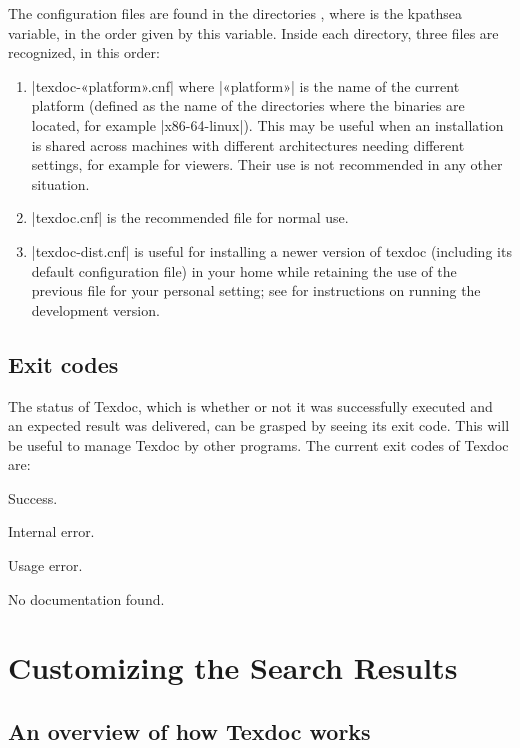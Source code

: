 \documentclass{texdoc-doc}
\begin{document}
The configuration files are found in the directories , where
 is the kpathsea variable, in the order given by this variable.
Inside each directory, three files are recognized, in this order:
%
\begin{enumerate}
\item |texdoc-«platform».cnf| where |«platform»| is the name of the current
  platform (defined as the name of the directories where the {\TL}
  binaries are located, for example |x86-64-linux|). This may be useful when
  an installation is shared across machines with different architectures
  needing different settings, for example for viewers. Their use is not
  recommended in any other situation.
\item |texdoc.cnf| is the recommended file for normal use.
\item |texdoc-dist.cnf| is useful for installing a newer version of texdoc
  (including its default configuration file) in your home while retaining
  the use of the previous file for your personal setting; see
  {\TexdocRepo} for instructions on running the development version.
\end{enumerate}

\subsection{Exit codes}
\label{sec:exit}

The status of Texdoc, which is whether or not it was successfully executed and
an expected result was delivered, can be grasped by seeing its exit code. This
will be useful to manage Texdoc by other programs. The current exit codes of
Texdoc are:
%
\begin{description}[left=2em]
\item[\code{0}] Success.
\item[\code{1}] Internal error.
\item[\code{2}] Usage error.
\item[\code{3}] No documentation found.
\end{description}

\section{Customizing the Search Results}

\subsection{An overview of how Texdoc works}
\end{document}

